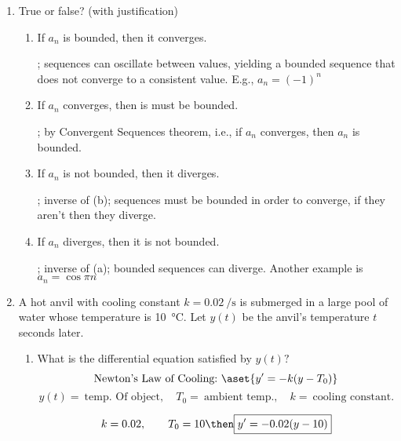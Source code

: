\documentclass{nosvagor-notes}
\begin{document}
\begin{enumerate}
  \item True or false? (with justification)
  \begin{enumerate}
    \item If \({a_n}\) is bounded, then it converges.

      ; sequences can oscillate between values, yielding a bounded sequence that does not converge to a consistent value. E.g., \(a_n = (-1)^{n}\)
      \vspace{90pt}

    \item If \({a_n}\) converges, then is must be bounded.

      ; by Convergent Sequences theorem, i.e., if
      \({a_n}\) converges, then \({a_n} \) is bounded.
      \vspace{90pt}

    \item If \({a_n}\) is not bounded, then it diverges.

      ;  inverse of (b); sequences must be bounded in order to
      converge, if they aren't then they diverge.
      \vspace{90pt}

    \item If \({a_n}\) diverges, then it is not bounded.

      ;  inverse of (a); bounded sequences can diverge. Another example is \(a_n = \cos \pi n\)
      \vspace{30pt}
  \end{enumerate}

  \newpage

 \item A hot anvil with cooling constant \(k = \SI{0.02}{\per\second}\) is
   submerged in a large pool of water whose temperature is \SI{10}{\celsius}.
   Let \(y(t)\) be the anvil’s temperature \(t\) seconds later.
   \begin{enumerate}
     \item What is the differential equation satisfied by \(y(t)?\)
       \[%
         \text{Newton's Law of Cooling:}~ \aset{y' = -k(y - T_0)}
       \]%
       \[%
        y(t) = ~\text{temp. Of object}, \quad T_0 = ~\text{ambient temp.}, \quad k = ~\text{cooling constant}.
       \]%

       \[%
         k = 0.02, \qquad T_0 = 10 \then \boxed{y' = -0.02(y - 10)}
       \]%
       \vspace{90pt}


\end{enumerate}
\end{enumerate}
\end{document}
